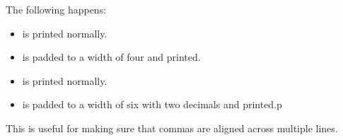 The following happens:
\begin{itemize}
  \item {} is printed normally.
  \item {} is padded to a width of four and printed.
  \item {} is printed normally.
  \item {} is padded to a width of six with two decimals and printed.p
\end{itemize}

This is useful for making sure that commas are aligned across multiple lines.
